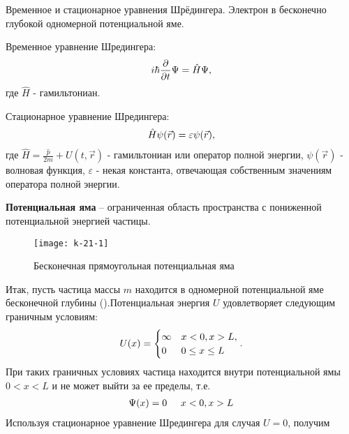 \documentclass[__main__.tex]{subfiles}
\begin{document}
Временное и стационарное уравнения Шрёдингера. Электрон в бесконечно глубокой одномерной потенциальной яме.\\

\begin{definition}
    Временное уравнение Шредингера:
    \begin{gather}
        i\hbar\frac{\partial{}}{\partial{t}}\Psi = \hat{H}\Psi,
        \llabel{shred-time}
    \end{gather}
    где $\hat{H}$ - гамильтониан.
\end{definition}
\begin{definition}
    Стационарное уравнение Шредингера:
    \begin{gather}
        \hat{H}\psi(\vec{r})=\varepsilon\psi(\vec{r}),
        \llabel{shred-stac}
    \end{gather}
    где $\hat{H}=\frac{\hat{p}}{2m}+U(t,\vec{r})$ - гамильтониан или оператор полной энергии, $\psi(\vec{r})$ - волновая функция, $\varepsilon$ - некая константа,  отвечающая собственным значениям оператора полной энергии.
\end{definition}
\begin{definition}
    \textbf{Потенциальная яма} – ограниченная область пространства с пониженной потенциальной энергией частицы.
\end{definition}
\begin{wrapfigure}{L}{.3\linewidth}
    \texttt{[image: k-21-1]}
    \caption{Бесконечная прямоугольная потенциальная яма}
\end{wrapfigure}
Итак, пусть частица массы $m$ находится в одномерной потенциальной яме бесконечной глубины ().Потенциальная энергия $U$ удовлетворяет следующим граничным условиям:
\begin{gather}
    \llabel{k-21-boundary}
    U(x)=
    \begin{cases}
        \infty & x<0,x>L,       \\
        0      & 0\leq x \leq L \\
    \end{cases}.
\end{gather}
При таких граничных условиях частица находится внутри потенциальной ямы $0 < x < L$ и не может выйти за ее пределы, т.е.
\begin{gather}
    \llabel{k-21-psi}
    \Psi(x)=0\hspace{0.5cm}x<0,x>L
\end{gather}
Используя стационарное уравнение Шредингера для случая $U=0$, получим
\end{document}
